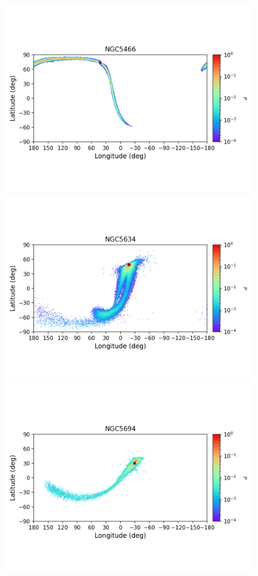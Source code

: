 \begin{figure}
        \includegraphics[clip=true, trim = 0mm 20mm 0mm 10mm, width=1\columnwidth]{images/error_plots_NGC5466.png}
        \includegraphics[clip=true, trim = 0mm 20mm 0mm 10mm, width=1\columnwidth]{images/error_plots_NGC5634.png}
        \includegraphics[clip=true, trim = 0mm 20mm 0mm 10mm, width=1\columnwidth]{images/error_plots_NGC5694.png}

\end{figure}
